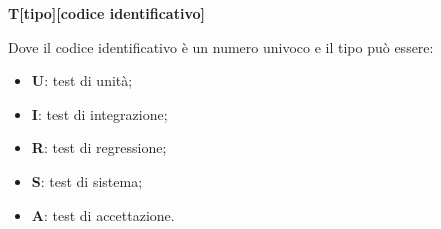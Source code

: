 \begin{center} \textbf{T[tipo][codice identificativo]} \end{center}

Dove il codice identificativo è un numero univoco e il tipo può essere:
\begin{itemize}
	\item \textbf{U}: test di unità;
	\item \textbf{I}: test di integrazione;
	\item \textbf{R}: test di regressione;
	\item \textbf{S}: test di sistema;
	\item \textbf{A}: test di accettazione.
\end{itemize}